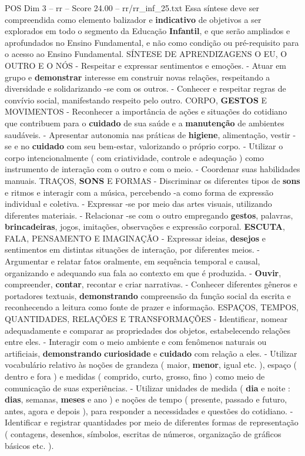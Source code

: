 \begin{textsample}{POS Dim 3 – rr – Score 24.00 – rr/rr\_inf\_25.txt}
Essa síntese deve ser compreendida como elemento balizador e \textbf{indicativo} de objetivos a ser explorados em todo o segmento da Educação \textbf{Infantil}, e que serão ampliados e aprofundados no Ensino Fundamental, e não como condição ou pré-requisito para o acesso ao Ensino Fundamental.
SÍNTESE DE APRENDIZAGENS O EU, O OUTRO E O NÓS - Respeitar e expressar sentimentos e emoções. - Atuar em grupo e \textbf{demonstrar} interesse em construir novas relações, respeitando a diversidade e solidarizando -se com os outros. - Conhecer e respeitar regras de convívio social, manifestando respeito pelo outro.
CORPO, \textbf{GESTOS} E MOVIMENTOS - Reconhecer a importância de ações e situações do cotidiano que contribuem para o \textbf{cuidado} de sua saúde e a \textbf{manutenção} de ambientes saudáveis. - Apresentar autonomia nas práticas de \textbf{higiene}, alimentação, vestir -se e no \textbf{cuidado} com seu bem-estar, valorizando o próprio corpo. - Utilizar o corpo intencionalmente ( com criatividade, controle e adequação ) como instrumento de interação com o outro e com o meio. - Coordenar suas habilidades manuais.
TRAÇOS, \textbf{SONS} E FORMAS - Discriminar os diferentes tipos de \textbf{sons} e ritmos e interagir com a música, percebendo -a como forma de expressão individual e coletiva. - Expressar -se por meio das artes visuais, utilizando diferentes materiais. - Relacionar -se com o outro empregando \textbf{gestos}, palavras, \textbf{brincadeiras}, jogos, imitações, observações e expressão corporal. \textbf{ESCUTA}, FALA, PENSAMENTO E IMAGINAÇÃO - Expressar ideias, \textbf{desejos} e sentimentos em distintas situações de interação, por diferentes meios. - Argumentar e relatar fatos oralmente, em sequência temporal e causal, organizando e adequando sua fala ao contexto em que é produzida. - \textbf{Ouvir}, compreender, \textbf{contar}, recontar e criar narrativas. - Conhecer diferentes gêneros e portadores textuais, \textbf{demonstrando} compreensão da função social da escrita e reconhecendo a leitura como fonte de prazer e informação.
ESPAÇOS, TEMPOS, QUANTIDADES, RELAÇÕES E TRANSFORMAÇÕES - Identificar, nomear adequadamente e comparar as propriedades dos objetos, estabelecendo relações entre eles. - Interagir com o meio ambiente e com fenômenos naturais ou artificiais, \textbf{demonstrando} \textbf{curiosidade} e \textbf{cuidado} com relação a eles. - Utilizar vocabulário relativo às noções de grandeza ( maior, \textbf{menor}, igual etc. ), espaço ( dentro e fora ) e medidas ( comprido, curto, grosso, fino ) como meio de comunicação de suas experiências. - Utilizar unidades de medida ( \textbf{dia} e noite : \textbf{dias}, semanas, \textbf{meses} e ano ) e noções de tempo ( presente, passado e futuro, antes, agora e depois ), para responder a necessidades e questões do cotidiano. - Identificar e registrar quantidades por meio de diferentes formas de representação ( contagens, desenhos, símbolos, escritas de números, organização de gráficos básicos etc. ).

\end{textsample}
